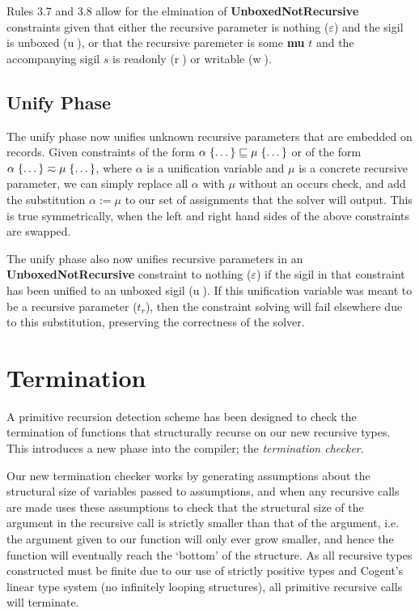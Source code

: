 Rules 3.7 and 3.8 allow for the elmination of \textbf{UnboxedNotRecursive} constraints
given that either the recursive parameter is nothing ($\varepsilon$) and the sigil is
unboxed (\textcircled{u}), or that the recursive paremeter is some \textbf{mu} $t$ and
the accompanying sigil $s$ is readonly (\textcircled{r}) or writable (\textcircled{w}).

\subsection{Unify Phase}

The unify phase now unifies unknown recursive parameters that are embedded
on records. Given constraints of the form 
$\alpha\; \{ \dots \} \sqsubseteq \mu\; \{ \dots \}$ or of the form
$\alpha\; \{ \dots \} \typeeq \mu\; \{ \dots \}$, where $\alpha$ is a unification
variable and $\mu$ is a concrete recursive parameter, we can simply replace all
$\alpha$ with $\mu$ without an occurs check, and add the substitution 
$\alpha := \mu$ to our set of assignments that the solver will output. 
This is true symmetrically, when the left and right hand sides of the above
constraints are swapped.

The unify phase also now unifies recursive parameters in an \textbf{UnboxedNotRecursive}
constraint to nothing ($\varepsilon$) if the sigil in that constraint has been unified to
an unboxed sigil (\textcircled{u}). If this unification variable was meant to be a recursive
parameter ($t_r$), then the constraint solving will fail elsewhere due to this substitution,
preserving the correctness of the solver.

\section{Termination}

A primitive recursion detection scheme has been designed to check the termination
of functions that structurally recurse on our new recursive types. This introduces
a new phase into the compiler; the \textit{termination checker}.

Our new termination checker works by generating assumptions about the structural
size of variables passed to assumptions, and when any recursive calls are made uses these
assumptions to check that the structural size of the argument in the recursive call
is strictly smaller than that of the argument, i.e. the argument given to our function
will only ever grow smaller, and hence the function will eventually reach the `bottom'
of the structure. As all recursive types constructed must be finite due to our use
of strictly positive types and Cogent's linear type system (no infinitely looping
structures), all primitive recursive calls will terminate.

